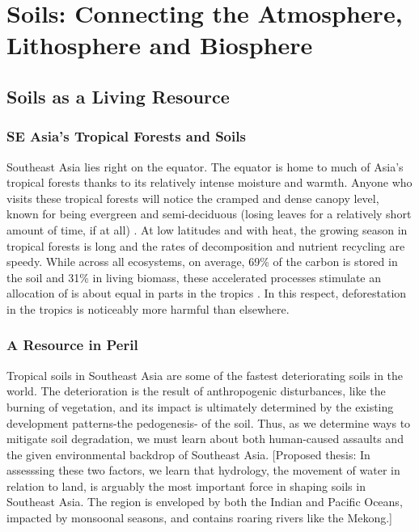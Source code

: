 \chapter{Soils: Connecting the Atmosphere, Lithosphere and Biosphere}\label{ch:soils}

\section{Soils as a Living Resource}

\subsection{SE Asia's Tropical Forests and Soils}

Southeast Asia lies right on the equator. The equator is home to much of Asia's tropical forests thanks to its relatively intense moisture and warmth. Anyone who visits these tropical forests will notice the cramped and dense canopy level, known for being evergreen and semi-deciduous (losing leaves for a relatively short amount of time, if at all) \citep{lieth2012tropical}. At low latitudes and with heat, the growing season in tropical forests is long and the rates of decomposition and nutrient recycling are speedy. While across all ecosystems, on average, 69\% of the carbon is stored in the soil and 31\% in living biomass, these accelerated processes stimulate an allocation of is about equal in parts in the tropics \citep{dixon1994carbon}. In this respect, deforestation in the tropics is noticeably more harmful than elsewhere.



\subsection{A Resource in Peril}

Tropical soils in Southeast Asia are some of the fastest deteriorating soils in the world. The deterioration is the result of anthropogenic disturbances, like the burning of vegetation, and its impact is ultimately determined by the existing development patterns-the pedogenesis- of the soil. Thus, as we determine ways to mitigate soil degradation, we must learn about both human-caused assaults and the given environmental backdrop of Southeast Asia. [Proposed thesis: In assesssing these two factors, we learn that hydrology, the movement of water in relation to land, is arguably the most important force in shaping soils in Southeast Asia. The region is enveloped by both the Indian and Pacific Oceans, impacted by monsoonal seasons, and contains roaring rivers like the Mekong.] 

